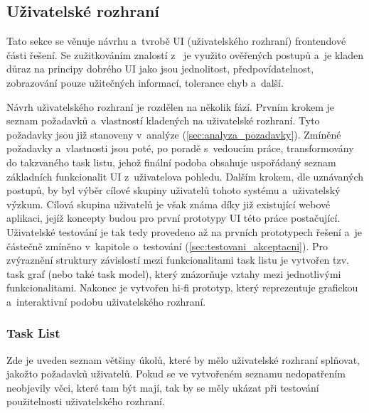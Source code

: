 \documentclass[thesis=M,czech]{FITthesis}[2012/06/26]
\begin{document}
\subsection{Uživatelské rozhraní}
Tato sekce se věnuje návrhu a~tvrobě UI (uživatelského rozhraní) frontendové části řešení. Se zužitkováním znalostí z~\cite{nur} je využito ověřených postupů a~je kladen důraz na principy dobrého UI jako jsou jednolitost, předpovídatelnost, zobrazování pouze užitečných informací, tolerance chyb a~další. 

Návrh uživatelského rozhraní je rozdělen na několik fází. Prvním krokem je seznam požadavků a~vlastností kladených na uživatelské rozhraní. Tyto požadavky jsou již stanoveny v~analýze (\ref{sec:analyza_pozadavky}). Zmíněné požadavky a~vlastnosti jsou poté, po poradě s~vedoucím práce, transformovány do takzvaného task listu, jehož finální podoba obsahuje uspořádaný seznam základních funkcionalit UI z~uživatelova pohledu. Dalším krokem, dle uznávaných postupů, by byl výběr cílové skupiny uživatelů tohoto systému a~uživatelský výzkum. Cílová skupina uživatelů je však známa díky již existující webové aplikaci, jejíž koncepty budou pro první prototypy UI této práce postačující. Uživatelské testování je tak tedy provedeno až na prvních prototypech řešení a~je částečně zmíněno v~kapitole o~testování (\ref{sec:testovani_akceptacni}). Pro zvýraznění struktury závislostí mezi funkcionalitami task listu je vytvořen tzv. task graf (nebo také task model), který znázorňuje vztahy mezi jednotlivými funkcionalitami. Nakonec je vytvořen hi-fi prototyp, který reprezentuje grafickou a~interaktivní podobu uživatelského rozhraní.

\subsubsection{Task List} \label{subsubsec:navrh_frontend_ui_tasklist}
Zde je uveden seznam většiny úkolů, které by mělo uživatelské rozhraní splňovat, jakožto požadavků uživatelů. Pokud se ve vytvořeném seznamu nedopatřením neobjevily věci, které tam být mají, tak by se měly ukázat při testování použitelnosti uživatelského rozhraní.
\end{document}
